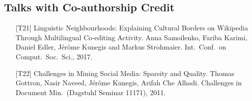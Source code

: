 \documentclass[line,mm]{res}
\newcounter{x}
\begin{document}
\begin{resume}
\section{Talks with Co-authorship Credit}
\begin{itemize}
  \item[{[T21]}] Linguistic Neighbourhoods: Explaining Cultural Borders on
    Wikipedia Through Multilingual Co-editing Activity.  Anna
    Samoilenko, Fariba Karimi, Daniel Edler, Jérôme Kunegis and Markus
    Strohmaier. 
    Int.\ Conf.\ on Comput.\ Soc.\ Sci., 2017. 
  \item[{[T22]}] Challenges in Mining Social Media: Sparsity and Quality.
    Thomas Gottron, Nasir Naveed, Jérôme Kunegis, Arifah Che Alhadi.
    Challenges in Document Min.\ (Dagstuhl Seminar 11171), 2011. 
\end{itemize}


\end{resume}
\end{document}
